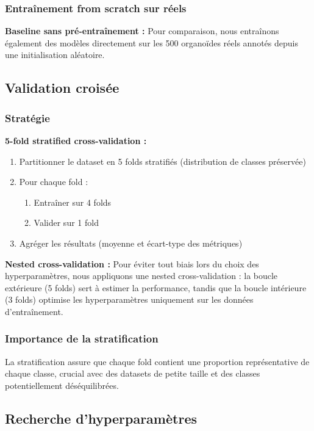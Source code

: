 \subsubsection{Entraînement from scratch sur réels}

\textbf{Baseline sans pré-entraînement :}
Pour comparaison, nous entraînons également des modèles directement sur les 500 organoïdes réels annotés depuis une initialisation aléatoire.

\subsection{Validation croisée}

\subsubsection{Stratégie}

\textbf{5-fold stratified cross-validation :}
\begin{enumerate}
    \item Partitionner le dataset en 5 folds stratifiés (distribution de classes préservée)
    \item Pour chaque fold :
    \begin{enumerate}
        \item Entraîner sur 4 folds
        \item Valider sur 1 fold
    \end{enumerate}
    \item Agréger les résultats (moyenne et écart-type des métriques)
\end{enumerate}

\textbf{Nested cross-validation :}
Pour éviter tout biais lors du choix des hyperparamètres, nous appliquons une nested cross-validation : la boucle extérieure (5 folds) sert à estimer la performance, tandis que la boucle intérieure (3 folds) optimise les hyperparamètres uniquement sur les données d’entraînement.

\subsubsection{Importance de la stratification}

La stratification assure que chaque fold contient une proportion représentative de chaque classe, crucial avec des datasets de petite taille et des classes potentiellement déséquilibrées.

\subsection{Recherche d'hyperparamètres}

